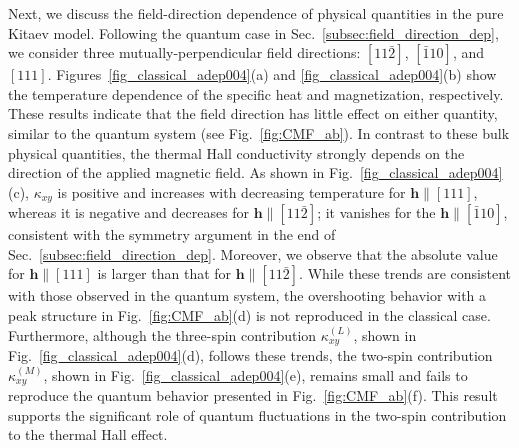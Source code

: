 \documentclass[twocolumn,superscriptaddress,showpacs, longbibliography, aps, prx]{revtex4-2}
\def\vec#1{\boldsymbol #1}
\begin{document}
Next, we discuss the field-direction dependence of physical quantities in the pure Kitaev model. 
Following the quantum case in Sec.~\ref{subsec:field_direction_dep}, we consider three mutually-perpendicular field directions: $[11\bar{2}]$, $[\bar{1}10]$, and $[111]$.
Figures~\ref{fig_classical_adep004}(a) and \ref{fig_classical_adep004}(b) show the temperature dependence of the specific heat and magnetization, respectively.
These results indicate that the field direction has little effect on either quantity, similar to the quantum system (see Fig.~\ref{fig:CMF_ab}). 
In contrast to these bulk physical quantities, the thermal Hall conductivity strongly depends on the direction of the applied magnetic field.
As shown in Fig.~\ref{fig_classical_adep004}(c), $\kappa_{xy}$ is positive and increases with decreasing temperature for $\vec{h}\parallel [111]$, whereas it is negative and decreases for
$\vec{h}\parallel [11\bar{2}]$; 
it vanishes for the $\vec{h}\parallel[\bar{1}10]$, consistent with the symmetry argument in the end of Sec.~\ref{subsec:field_direction_dep}.
Moreover, we observe that the absolute value for $\vec{h}\parallel [111]$ is larger than that for $\vec{h}\parallel [11\bar{2}]$.
While these trends are consistent with those observed in the quantum system, 
the overshooting behavior with a peak structure in Fig.~\ref{fig:CMF_ab}(d) is not reproduced in the classical case.
Furthermore, although the three-spin contribution $\kappa_{xy}^{(L)}$, shown in Fig.~\ref{fig_classical_adep004}(d), follows these trends, the two-spin contribution $\kappa_{xy}^{(M)}$, shown in Fig.~\ref{fig_classical_adep004}(e), remains small and fails to reproduce the quantum behavior presented in Fig.~\ref{fig:CMF_ab}(f). 
This result supports the significant role of quantum fluctuations in the two-spin contribution to the thermal Hall effect.
\end{document}
